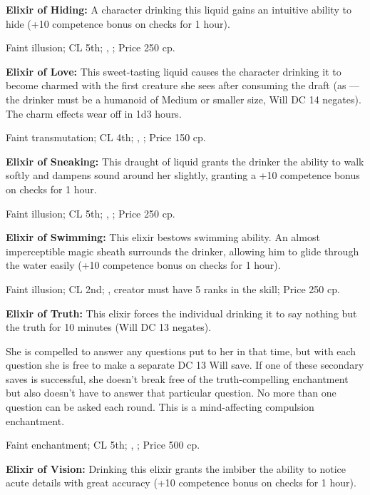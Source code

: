 \textbf{Elixir of Hiding:} A character drinking this liquid gains an intuitive ability to hide (+10 competence bonus on  checks for 1 hour).

Faint illusion; CL 5th; , ; Price 250 cp.



\textbf{Elixir of Love:} This sweet-tasting liquid causes the character drinking it to become charmed with the first creature she sees after consuming the draft (as ---the drinker must be a humanoid of Medium or smaller size, Will DC 14 negates). The charm effects wear off in 1d3 hours.

Faint transmutation; CL 4th; , ; Price 150 cp.



\textbf{Elixir of Sneaking:} This draught of liquid grants the drinker the ability to walk softly and dampens sound around her slightly, granting a +10 competence bonus on  checks for 1 hour.

Faint illusion; CL 5th; , ; Price 250 cp.



\textbf{Elixir of Swimming:} This elixir bestows swimming ability. An almost imperceptible magic sheath surrounds the drinker, allowing him to glide through the water easily (+10 competence bonus on  checks for 1 hour).

Faint illusion; CL 2nd; , creator must have 5 ranks in the  skill; Price 250 cp.



\textbf{Elixir of Truth:} This elixir forces the individual drinking it to say nothing but the truth for 10 minutes (Will DC 13 negates).

She is compelled to answer any questions put to her in that time, but with each question she is free to make a separate DC 13 Will save. If one of these secondary saves is successful, she doesn't break free of the truth-compelling enchantment but also doesn't have to answer that particular question. No more than one question can be asked each round. This is a mind-affecting compulsion enchantment.

Faint enchantment; CL 5th; , ; Price 500 cp.



\textbf{Elixir of Vision:} Drinking this elixir grants the imbiber the ability to notice acute details with great accuracy (+10 competence bonus on  checks for 1 hour).

